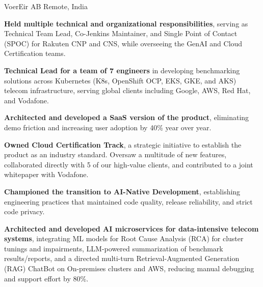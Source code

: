 

\begin{cventries}

  \cventry
    {VoerEir AB} %
    {Remote, India} %
    {} %
    {} %
    {
      \begin{cvitems} %
        \item {\textbf{Held multiple technical and organizational responsibilities}, serving as Technical Team Lead, Co-Jenkins Maintainer, and Single Point of Contact (SPOC) for Rakuten CNP and CNS, while overseeing the GenAI and Cloud Certification teams.}
        \item {\textbf{Technical Lead for a team of 7 engineers} in developing benchmarking solutions across Kubernetes (K8s, OpenShift OCP, EKS, GKE, and AKS) telecom infrastructure, serving global clients including Google, AWS, Red Hat, and Vodafone.}
        \item {\textbf{Architected and developed a SaaS version of the product}, eliminating demo friction and increasing user adoption by 40\% year over year.}
        \item {\textbf{Owned Cloud Certification Track}, a strategic initiative to establish the product as an industry standard. Oversaw a multitude of new features, collaborated directly with 5 of our high-value clients, and contributed to a joint whitepaper with Vodafone.}
        \item {\textbf{Championed the transition to AI-Native Development}, establishing engineering practices that maintained code quality, release reliability, and strict code privacy.}
        \item {\textbf{Architected and developed AI microservices for data-intensive telecom systems}, integrating ML models for Root Cause Analysis (RCA) for cluster tunings and impairments, LLM-powered summarization of benchmark results/reports, and a directed multi-turn Retrieval-Augmented Generation (RAG) ChatBot on On-premises clusters and AWS, reducing manual debugging and support effort by 80\%.}
      \end{cvitems}
    }


\end{cventries}
